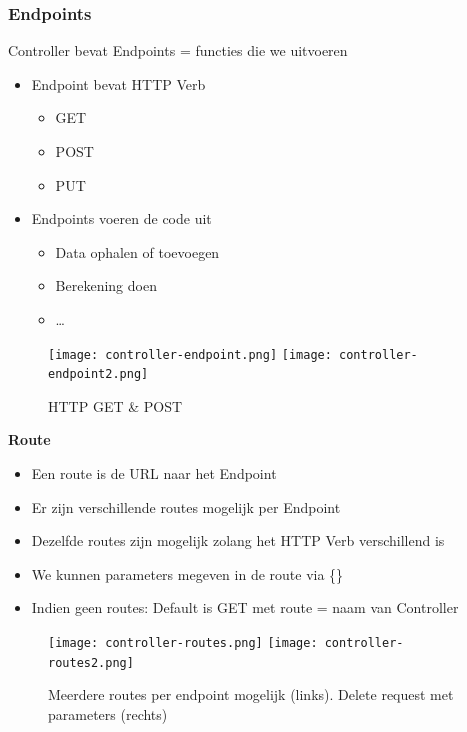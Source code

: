 \documentclass{article}
\begin{document}
\subsubsection{Endpoints}

Controller bevat Endpoints = functies die we uitvoeren

\begin{itemize}
    \item Endpoint bevat HTTP Verb
    \begin{itemize}
        \item GET
        \item POST
        \item PUT
    \end{itemize}
    \item Endpoints voeren de code uit
    \begin{itemize}
        \item Data ophalen of toevoegen
        \item Berekening doen
        \item \dots
    \end{itemize}
\end{itemize}

\begin{figure}[H]
    \centering
    \texttt{[image: controller-endpoint.png]}
    \texttt{[image: controller-endpoint2.png]}
    \caption{HTTP GET \& POST}
\end{figure}

\textbf{Route}

\begin{itemize}
    \item Een route is de URL naar het Endpoint
    \item Er zijn verschillende routes mogelijk per Endpoint
    \item Dezelfde routes zijn mogelijk zolang het HTTP Verb verschillend is
    \item We kunnen parameters megeven in de route via \{\}
    \item Indien geen routes: Default is GET met route = naam van Controller
\end{itemize}

\begin{figure}[H]
    \centering
    \texttt{[image: controller-routes.png]}
    \texttt{[image: controller-routes2.png]}
    \caption{Meerdere routes per endpoint mogelijk (links). Delete request met parameters (rechts)}
\end{figure}
\end{document}
